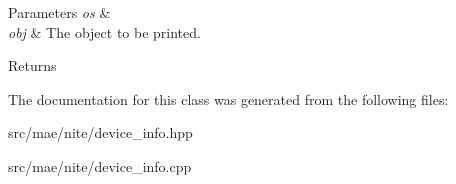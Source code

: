 \begin{DoxyParams}{Parameters}
{\em os} & \\
\hline
{\em obj} & The object to be printed. \\
\hline
\end{DoxyParams}
\begin{DoxyReturn}{Returns}

\end{DoxyReturn}


The documentation for this class was generated from the following files\-:\begin{DoxyCompactItemize}
\item 
src/mae/nite/device\-\_\-info.\-hpp\item 
src/mae/nite/device\-\_\-info.\-cpp\end{DoxyCompactItemize}

